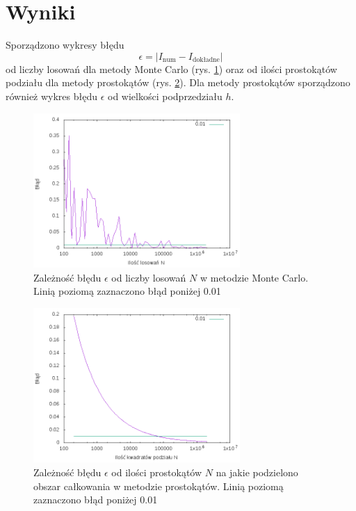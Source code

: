 \documentclass[11pt]{article}
\begin{document}
\section*{Wyniki}
Sporządzono wykresy błędu $$\epsilon=|I_{\mbox{num}}-I_{\mbox{dokładne}}|$$ od liczby losowań dla metody Monte Carlo (rys. \ref{1})
oraz od ilości prostokątów podziału dla metody prostokątów (rys. \ref{2}). Dla metody prostokątów sporządzono również wykres błędu $\epsilon$
od wielkości podprzedziału $h$.
\begin{figure} 
\centering
\includegraphics[width=0.7\textwidth]{MC2.png}
\caption{Zależność błędu $\epsilon$ od liczby losowań $N$ w metodzie Monte Carlo. Linią poziomą zaznaczono błąd poniżej 0.01}\label{1}
\end{figure}
\begin{figure} 
\centering
\includegraphics[width=0.7\textwidth]{PRST2.png}
\caption{Zależność błędu $\epsilon$ od ilości prostokątów $N$ na jakie podzielono obszar całkowania w metodzie prostokątów. 
	Linią poziomą zaznaczono błąd poniżej 0.01}\label{2}
\end{figure}
\end{document}
